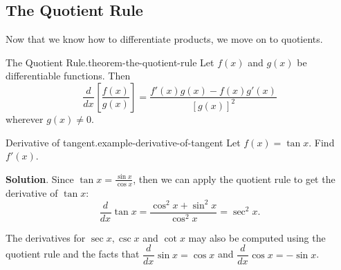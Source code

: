 \documentclass[10pt,]{book}
\numberwithin{equation}{section}
\newcommand{\dv}[3][]{\dfrac{d^{#1} #2}{d #3^{#1}}}
\begin{document}
\subsection[{The Quotient Rule}]{The Quotient Rule}\label{subsection-the-quotient-rule}
\hypertarget{p-144}{}%
Now that we know how to differentiate products, we move on to quotients.%
\begin{theorem}{The Quotient Rule.}{}{theorem-the-quotient-rule}%
\hypertarget{p-145}{}%
Let \(f(x)\) and \(g(x)\) be differentiable functions. Then%
\begin{equation*}
\dv{}{x}\left[\frac{f(x)}{g(x)}\right] = \frac{f'(x)g(x) - f(x)g'(x)}{[g(x)]^{2}}
\end{equation*}
wherever \(g(x)\neq0\).%
\end{theorem}
\begin{example}{Derivative of tangent.}{example-derivative-of-tangent}%
\hypertarget{p-146}{}%
Let \(f(x) = \tan x\). Find \(f'(x)\).%
\par\smallskip%
\noindent\textbf{Solution}.\hypertarget{solution-29}{}\quad%
\hypertarget{p-147}{}%
Since \(\tan x = \frac{\sin x}{\cos x}\), then we can apply the quotient rule to get the derivative of \(\tan x\):%
\begin{equation*}
\dv{}{x}\tan x = \frac{\cos^{2}x + \sin^{2}x}{\cos^{2}x} = \sec^{2}x.
\end{equation*}
%
\end{example}
\hypertarget{p-148}{}%
The derivatives for \(\sec x, \csc x\) and \(\cot x\) may also be computed using the quotient rule and the facts that \(\dv{}{x}\sin x = \cos x\) and \(\dv{}{x}\cos x = -\sin x\).%
%
%
\typeout{************************************************}
\typeout{************************************************}
%
\end{document}
